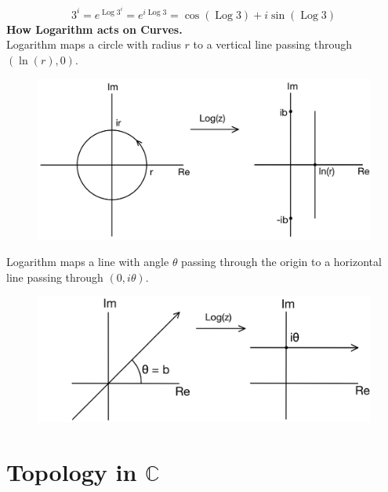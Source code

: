 \documentclass[11pt]{article}
\begin{document}
$$3^i = e^{\operatorname{Log}{3^i}} = e^{i\operatorname{Log}{3}} = \cos{(\operatorname{Log}{3})} + i \sin{(\operatorname{Log}{3})}$$
\newpage
\textbf{How Logarithm acts on Curves. }\\
Logarithm maps a circle with radius $r$ to a vertical line passing through $(\ln(r), 0)$. \\
\begin{figure}[H]
\includegraphics[scale = 0.2]{3_5}
\centering
\end{figure}
Logarithm maps a line with angle $\theta$ passing through the origin to a horizontal line passing through $(0, i\theta)$. 
\begin{figure}[H]
\includegraphics[scale = 0.21]{3_6}
\centering
\end{figure}

\newpage
\section{Topology in $\mathbb{C}$}
\end{document}

